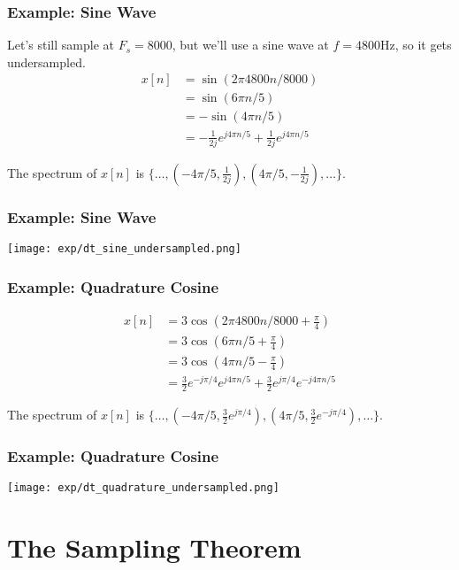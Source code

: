 \documentclass{beamer}
\begin{document}
\begin{frame}
  \frametitle{Example: Sine Wave}

  Let's still sample at $F_s=8000$, but we'll use a sine wave at
  $f=4800$Hz, so it gets undersampled.
  \begin{align*}
    x[n] &= \sin\left(2\pi 4800n/8000\right)\\
    &= \sin\left(6\pi n/5\right)\\
    &= -\sin\left(4\pi n/5\right)\\
    &= -\frac{1}{2j}e^{j4\pi n/5} + \frac{1}{2j}e^{j4\pi n/5}
  \end{align*}

  The spectrum of $x[n]$ is $\{\ldots,(-4\pi/5,\frac{1}{2j}),(4\pi/5,-\frac{1}{2j}),\ldots\}$.
\end{frame}

\begin{frame}
  \frametitle{Example: Sine Wave}

  \centerline{\texttt{[image: exp/dt\_sine\_undersampled.png]}}
\end{frame}

\begin{frame}
  \frametitle{Example: Quadrature Cosine}

  \begin{align*}
    x[n] &= 3\cos\left(2\pi 4800n/8000+\frac{\pi}{4}\right)\\
    &= 3\cos\left(6\pi n/5+\frac{\pi}{4}\right)\\
    &= 3\cos\left(4\pi n/5-\frac{\pi}{4}\right)\\
    &= \frac{3}{2}e^{-j\pi/4}e^{j4\pi n/5} + \frac{3}{2}e^{j\pi/4}e^{-j4\pi n/5}
  \end{align*}

  The spectrum of $x[n]$ is $\{\ldots,(-4\pi/5,\frac{3}{2}e^{j\pi/4}),(4\pi/5,\frac{3}{2}e^{-j\pi/4}),\ldots\}$.
\end{frame}

\begin{frame}
  \frametitle{Example: Quadrature Cosine}

  \centerline{\texttt{[image: exp/dt\_quadrature\_undersampled.png]}}
\end{frame}

\section[Sampling Theorem]{The Sampling Theorem}
\setcounter{subsection}{1}
\end{document}
